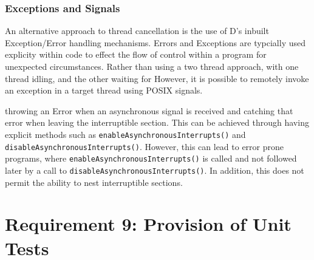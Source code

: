 \subsubsection*{Exceptions and Signals}
An alternative approach to thread cancellation is the use of D's inbuilt Exception/Error 
handling mechanisms. Errors and Exceptions are typcially used explicity within code 
to effect the flow of control within a program for unexpected circumstances. 
Rather than using a two thread approach, with one thread idling, and the other 
waiting for 
However, it is possible to remotely invoke an exception in a target thread 
using POSIX signals. 

throwing an Error when an asynchronous signal is received and 
catching that error when leaving the interruptible section. This can be 
achieved through having explicit methods such as \texttt{enableAsynchronousInterrupts()}
and \texttt{disableAsynchronousInterrupts()}. However, this can lead to error 
prone programs, where \texttt{enableAsynchronousInterrupts()} is called and not 
followed later by a call to \texttt{disableAsynchronousInterrupts()}. 
In addition, this does not permit the ability to nest interruptible sections. 

\section{Requirement 9: Provision of Unit Tests}
